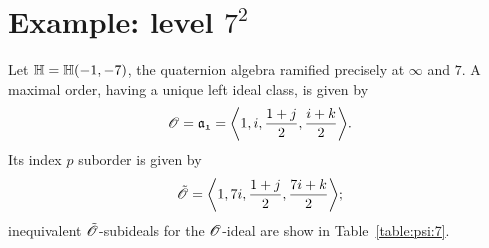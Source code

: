 \section{Example: level $7^2$}
Let ${\mathbb{H}}={\mathbb{H}}(-1,-7)$,
the quaternion algebra ramified precisely at $\infty$ and $7$.
A maximal order,
having a unique left ideal class, is given by
\begin{align*}
   \O=\id{a_{1}}&=\<1,i,\frac{1+j}{2},\frac{i+k}{2}>. \\
\end{align*}
Its index $p$ suborder is given by
\[
  \Ot = \<1,7i,\frac{1+j}{2},\frac{7i+k}{2}>;
\]
inequivalent ${\tilde{{\mathscr{O}}}}$-subideals for the ${\mathscr{O}}$-ideal are show in
Table~\ref{table:psi:7}.

